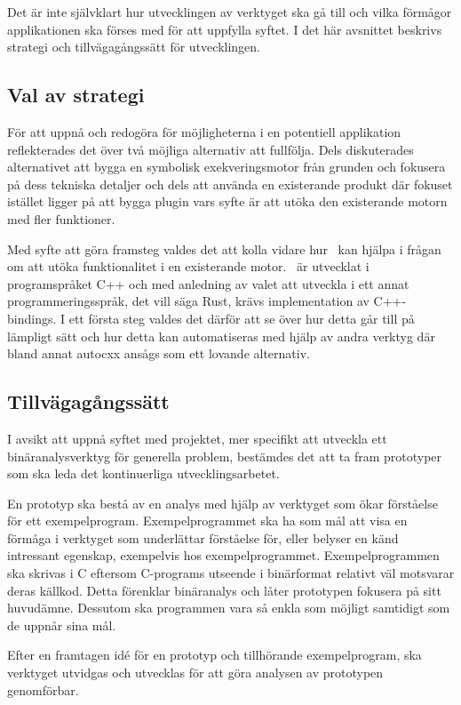 Det är inte självklart hur utvecklingen av verktyget ska gå till och vilka
förmågor applikationen ska förses med för att uppfylla syftet. I det här
avsnittet beskrivs strategi och tillvägagångssätt för utvecklingen.

\subsection{Val av strategi}

För att uppnå och redogöra för möjligheterna i en potentiell applikation
reflekterades det över två möjliga alternativ att fullfölja. Dels diskuterades
alternativet att bygga en symbolisk exekveringsmotor från grunden och fokusera
på dess tekniska detaljer och dels att använda en existerande produkt där
fokuset istället ligger på att bygga plugin vars syfte är att utöka den
existerande motorn med fler funktioner.

Med syfte att göra framsteg valdes det att kolla vidare hur \stoe\ kan hjälpa i
frågan om att utöka funktionalitet i en existerande motor. \stoe\ är utvecklat
i programspråket C++ och med anledning av valet att utveckla i ett
annat programmeringsspråk, det vill säga Rust, krävs implementation av
C++-bindings. I ett första steg valdes det därför att se över hur detta går till
på lämpligt sätt och hur detta kan automatiseras med hjälp av andra verktyg
där bland annat autocxx ansågs som ett lovande alternativ.

\subsection{Tillvägagångssätt}
I avsikt att uppnå syftet med projektet, mer specifikt att utveckla ett
binäranalysverktyg för generella problem, bestämdes det att ta fram prototyper som ska leda det
kontinuerliga utvecklingsarbetet.

En prototyp ska bestå av en analys med hjälp av verktyget som ökar förståelse för
ett exempelprogram. Exempelprogrammet ska ha som mål att visa en förmåga i
verktyget som underlättar förståelse för, eller belyser en känd intressant
egenskap, exempelvis hos exempelprogrammet. Exempelprogrammen ska skrivas i C eftersom
C-programs utseende i binärformat relativt väl motsvarar deras källkod. Detta
förenklar binäranalys och låter prototypen fokusera på sitt huvudämne. Dessutom ska
programmen vara så enkla som möjligt samtidigt som de uppnår sina mål.

Efter en framtagen id\'e för en prototyp och tillhörande exempelprogram, ska
verktyget utvidgas och utvecklas för att göra analysen av prototypen genomförbar.

